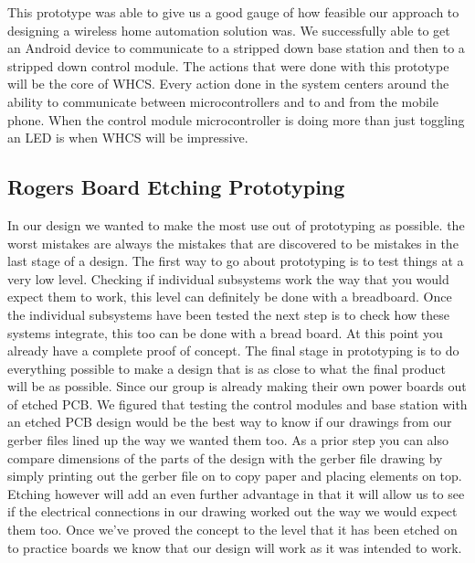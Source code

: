 This prototype was able to give us a good gauge of how feasible
our approach to designing a wireless home automation solution was. We
successfully able to get an Android device to communicate to a stripped down
base station and then to a stripped down control module. The actions that were
done with this prototype will be the core of WHCS. Every action done in the
system centers around the ability to communicate between microcontrollers and
to and from the mobile phone.  When the control module microcontroller is doing
more than just toggling an LED is when WHCS will be impressive.

\subsection{Rogers Board Etching Prototyping}
In our design we wanted to make the most use out of prototyping as possible.
the worst mistakes are always the mistakes that are discovered to be mistakes
in the last stage of a design. The first way to go about prototyping is to test
things at a very low level. Checking if individual subsystems work the way that
you would expect them to work, this level can definitely be done with a
breadboard. Once the individual subsystems have been tested the next step is to
check how these systems integrate, this too can be done with a bread board. At
this point you already have a complete proof of concept. The final stage in
prototyping is to do everything possible to make a design that is as close to
what the final product will be as possible. Since our group is already making
their own power boards out of etched PCB. We figured that testing the control
modules and base station with an etched PCB design would be the best way to
know if our drawings from our gerber files lined up the way we wanted them too.
As a prior step you can also compare dimensions of the parts of the design with
the gerber file drawing by simply printing out the gerber file on to copy paper
and placing elements on top. Etching however will add an even further advantage
in that it will allow us to see if the electrical connections in our drawing
worked out the way we would expect them too. Once we{}'ve proved the concept to
the level that it has been etched on to practice boards we know that our design
will work as it was intended to work.

